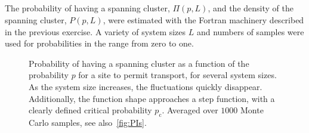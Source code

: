 \documentclass[11pt,british,a4paper]{report}
\begin{document}
\subsection{}
The probability of having a spanning cluster, \(\Pi(p,L)\), and the density of the spanning cluster, \(P(p,L)\), were estimated with the Fortran machinery described in the previous exercise. A variety of system sizes \(L\) and numbers of samples were used for probabilities in the range from zero to one.
\begin{figure}[tbh]
    \centering
    \caption{Probability of having a spanning cluster as a function of the probability \(p\) for a site to permit transport, for several system sizes. As the system size increases, the fluctuations quickly disappear. Additionally, the function shape approaches a step function, with a clearly defined critical probability \(p_\mathrm{c}\). Averaged over \(\num{1000}\) Monte Carlo samples, see also~\vref{fig:PIs}.}%
    \label{fig:PIL}
\end{figure}
\end{document}
